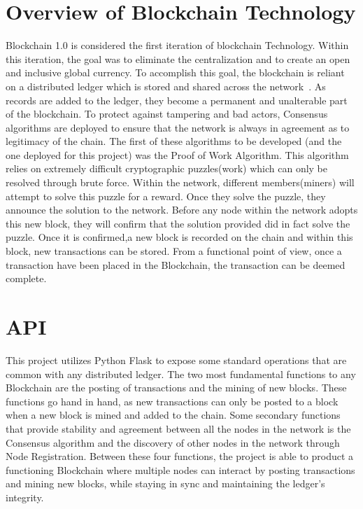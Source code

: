 \section{Overview of Blockchain Technology}

Blockchain 1.0 is considered the first iteration of blockchain Technology. 
Within this iteration, the goal was to eliminate the centralization and to 
create an open and inclusive global currency. To accomplish this goal, the 
blockchain is reliant on a distributed ledger which is stored and shared across 
the network~\cite{hid-sp18-414-www-promise-bitcoin-blockchain}. As records are added to the ledger, they become a permanent and unalterable part of the blockchain. To protect against tampering and bad actors, Consensus algorithms are deployed to ensure that the network is always in agreement as to legitimacy of the chain. The first of these algorithms to be developed (and the one deployed for this project) was the Proof of Work Algorithm. This 
algorithm relies on extremely difficult cryptographic puzzles(work) which can 
only be resolved through brute force. Within the network, different members(miners) will attempt to solve this puzzle for a reward. Once they solve the puzzle, they announce the solution to the network. Before any node within the network adopts this new block, they will confirm that the solution provided did in fact solve the puzzle. Once it is confirmed,a new block is recorded on the chain and within this block, new transactions can be stored. From a functional point of view, once a transaction have been placed in the Blockchain, the transaction can be deemed complete.~\cite{hid-sp18-414-financialinnovation-zhao}

\section{API}

This project utilizes Python Flask to expose some standard operations that 
are common with any distributed ledger. The two most fundamental functions to any Blockchain 
are the posting of transactions and the mining of new blocks. These functions go hand in hand, 
as new transactions can only be posted to a block when a new block is mined and added to the chain. Some secondary functions that provide stability and agreement between all the nodes 
in the network is the Consensus algorithm and the discovery of other nodes in the network 
through Node Registration. Between these four functions, the project is able to product a 
functioning Blockchain where multiple nodes can interact by posting transactions and mining 
new blocks, while staying in sync and maintaining the ledger's integrity.

